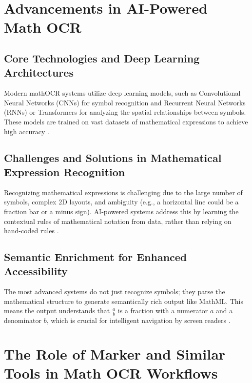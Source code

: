 \section{Advancements in AI-Powered Math OCR}\label{ch11:sec:ai-ocr-advancements}
\subsection{Core Technologies and Deep Learning Architectures}\label{ch11:ssec:core-tech}
Modern \gls{mathOCR} systems utilize deep learning models, such as Convolutional Neural Networks (CNNs) for symbol recognition and Recurrent Neural Networks (RNNs) or Transformers for analyzing the spatial relationships between symbols. These models are trained on vast datasets of mathematical expressions to achieve high accuracy \supercite{ArxivMER2203, ArxivMER2303}.

\subsection{Challenges and Solutions in Mathematical Expression Recognition}\label{ch11:ssec:challenges}
Recognizing mathematical expressions is challenging due to the large number of symbols, complex 2D layouts, and ambiguity (e.g., a horizontal line could be a fraction bar or a minus sign). \gls{AI}-powered systems address this by learning the contextual rules of mathematical notation from data, rather than relying on hand-coded rules \supercite{ResearchGateMathSVM, WorldScientificMathOCR}.

\subsection{Semantic Enrichment for Enhanced Accessibility}\label{ch11:ssec:semantic-enrichment}
The most advanced systems do not just recognize symbols; they parse the mathematical structure to generate semantically rich output like \gls{MathML}. This means the output understands that $\frac{a}{b}$ is a fraction with a numerator $a$ and a denominator $b$, which is crucial for intelligent navigation by screen readers \supercite{IBMSemanticAI, OntotextSemanticAI}.

\section{The Role of Marker and Similar Tools in Math OCR Workflows}\label{ch11:sec:marker}
